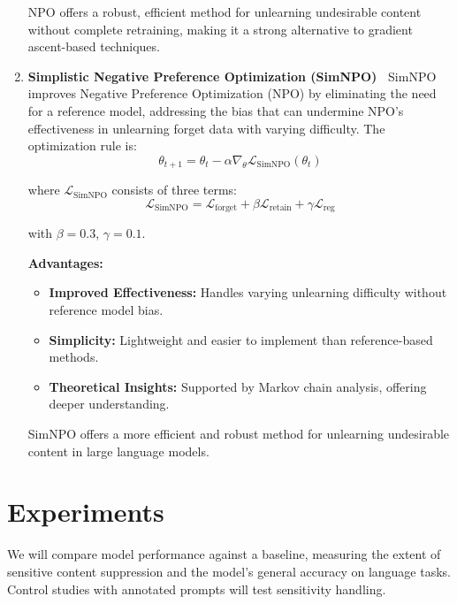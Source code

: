 \documentclass[11pt]{article}
\begin{document}
\begin{enumerate}
        NPO offers a robust, efficient method for unlearning undesirable content without complete retraining, making it a strong alternative to gradient ascent-based techniques.


        \item \textbf{Simplistic Negative Preference Optimization (SimNPO)~\cite{fan2024simplicity} }
        SimNPO improves Negative Preference Optimization (NPO) by eliminating the need for a reference model, addressing the bias that can undermine NPO’s effectiveness in unlearning forget data with varying difficulty. The optimization rule is:
        \vspace{-3pt}
        \[
            \theta_{t+1} = \theta_t - \alpha \nabla_{\theta} \mathcal{L}_{\text{SimNPO}}(\theta_t)
        \]

        where $\mathcal{L}_{\text{SimNPO}}$ consists of three terms:
        \vspace{-3pt}
        \[
            \mathcal{L}_{\text{SimNPO}} = \mathcal{L}_{\text{forget}} + \beta \mathcal{L}_{\text{retain}} + \gamma \mathcal{L}_{\text{reg}}
        \]

        with $\beta = 0.3$, $\gamma = 0.1$.

        \textbf{Advantages:}
        \begin{itemize}
            \item \textbf{Improved Effectiveness:} Handles varying unlearning difficulty without reference model bias.
            \item \textbf{Simplicity:} Lightweight and easier to implement than reference-based methods.
            \item \textbf{Theoretical Insights:} Supported by Markov chain analysis, offering deeper understanding.
        \end{itemize}

        SimNPO offers a more efficient and robust method for unlearning undesirable content in large language models.


    \end{enumerate}


    \section{Experiments}
    We will compare model performance against a baseline, measuring the extent of sensitive content suppression and the model's general accuracy on language tasks. Control studies with annotated prompts will test sensitivity handling.
\end{document}
